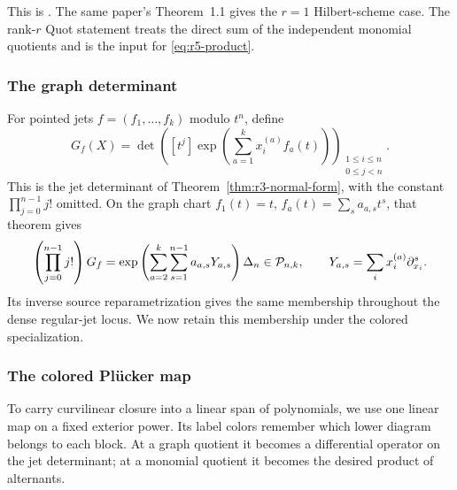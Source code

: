 This is \cite[Theorem~1.3, equivalently Theorem~5.2]{r5-BS}.
The same paper's Theorem~1.1 gives the $r=1$ Hilbert-scheme case.
The rank-$r$ Quot statement treats the direct sum of the independent
monomial quotients and is the input for \eqref{eq:r5-product}.

\subsubsection{The graph determinant}

For pointed jets $f=(f_1,\ldots,f_k)$ modulo $t^n$, define
\begin{equation}\label{eq:r5-jet-determinant}
 G_f(X)=\det\left([t^j]\exp\left(\sum_{a=1}^k
                                 x_i^{(a)}f_a(t)\right)\right)
                _{\substack{1\leq i\leq n\\0\leq j<n}}.
\end{equation}
This is the jet determinant of
Theorem~\ref{thm:r3-normal-form}, with the constant
$\prod_{j=0}^{n-1}j!$ omitted. On the graph chart
$f_1(t)=t$, $f_a(t)=\sum_s a_{a,s}t^s$, that theorem gives
\begin{equation}\label{eq:r5-graph-operator}
 \left(\prod_{j=0}^{n-1}j!\right)G_f
 =\exp\left(\sum_{a=2}^k\sum_{s=1}^{n-1}a_{a,s}Y_{a,s}\right)
       \Delta_n\in\mathcal P_{n,k},
 \qquad Y_{a,s}=\sum_i x_i^{(a)}\partial_{x_i}^{s}.
\end{equation}
Its inverse source reparametrization gives the same membership
throughout the dense regular-jet locus. We now retain this
membership under the colored specialization.

\subsubsection{The colored Pl\"ucker map}

To carry curvilinear closure into a linear span of polynomials,
we use one linear map on a fixed exterior power.  Its label colors
remember which lower diagram belongs to each block.  At a graph
quotient it becomes a differential operator on the jet determinant;
at a monomial quotient it becomes the desired product of alternants.

